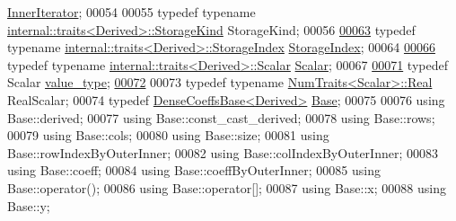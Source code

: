 \begin{DoxyCode}
      \hyperlink{group___core___module_a4dc102b445d8fb48a28dfcd22323f649}{InnerIterator};
00054 
00055     \textcolor{keyword}{typedef} \textcolor{keyword}{typename} \hyperlink{struct_eigen_1_1internal_1_1traits}{internal::traits<Derived>::StorageKind} 
      StorageKind;
00056 
\hyperlink{group___core___module_a2d1aba3f6c414715d830f760913c7e00}{00063}     \textcolor{keyword}{typedef} \textcolor{keyword}{typename} \hyperlink{struct_eigen_1_1internal_1_1traits}{internal::traits<Derived>::StorageIndex} 
      \hyperlink{group___core___module_a2d1aba3f6c414715d830f760913c7e00}{StorageIndex};
00064 
\hyperlink{group___core___module_a5feed465b3a8e60c47e73ecce83e39a2}{00066}     \textcolor{keyword}{typedef} \textcolor{keyword}{typename} \hyperlink{struct_eigen_1_1internal_1_1traits}{internal::traits<Derived>::Scalar} 
      \hyperlink{group___core___module_a5feed465b3a8e60c47e73ecce83e39a2}{Scalar};
00067     
\hyperlink{group___core___module_a9276182dab8236c33f1e7abf491d504d}{00071}     \textcolor{keyword}{typedef} Scalar \hyperlink{group___core___module_a9276182dab8236c33f1e7abf491d504d}{value\_type};
\hyperlink{group___core___module_a62031481df360a63794c4227140546cd}{00072}     
00073     \textcolor{keyword}{typedef} \textcolor{keyword}{typename} \hyperlink{group___core___module_struct_eigen_1_1_num_traits}{NumTraits<Scalar>::Real} RealScalar;
00074     \textcolor{keyword}{typedef} \hyperlink{class_eigen_1_1_dense_coeffs_base}{DenseCoeffsBase<Derived>} \hyperlink{class_eigen_1_1_dense_coeffs_base}{Base};
00075 
00076     \textcolor{keyword}{using} Base::derived;
00077     \textcolor{keyword}{using} Base::const\_cast\_derived;
00078     \textcolor{keyword}{using} Base::rows;
00079     \textcolor{keyword}{using} Base::cols;
00080     \textcolor{keyword}{using} Base::size;
00081     \textcolor{keyword}{using} Base::rowIndexByOuterInner;
00082     \textcolor{keyword}{using} Base::colIndexByOuterInner;
00083     \textcolor{keyword}{using} Base::coeff;
00084     \textcolor{keyword}{using} Base::coeffByOuterInner;
00085     \textcolor{keyword}{using} Base::operator();
00086     \textcolor{keyword}{using} Base::operator[];
00087     \textcolor{keyword}{using} Base::x;
00088     \textcolor{keyword}{using} Base::y;

\end{DoxyCode}
